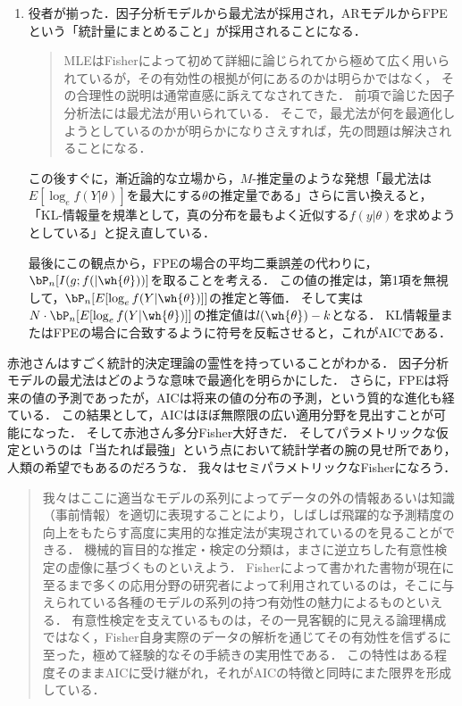 \documentclass[uplatex,dvipdfmx]{jsreport}
\begin{document}
\begin{history}
\begin{enumerate}
        \item 役者が揃った．因子分析モデルから最尤法が採用され，ARモデルからFPEという「統計量にまとめること」が採用されることになる．
        \begin{quote}
            MLEはFisherによって初めて詳細に論じられてから極めて広く用いられているが，その有効性の根拠が何にあるのかは明らかではなく，
            その合理性の説明は通常直感に訴えてなされてきた．
            前項で論じた因子分析法には最尤法が用いられている．
            そこで，最尤法が何を最適化しようとしているのかが明らかになりさえすれば，先の問題は解決されることになる．
        \end{quote}
        この後すぐに，漸近論的な立場から，$M$-推定量のような発想「最尤法は$E[\log_ef(Y|\theta)]$を最大にする$\theta$の推定量である」さらに言い換えると，
        「KL-情報量を規準として，真の分布を最もよく近似する$f(y|\theta)$を求めようとしている」と捉え直している．

        最後にこの観点から，FPEの場合の平均二乗誤差の代わりに，
        $\bP_n[I(g;f(|\wh{\theta}))]$を取ることを考える．
        この値の推定は，第1項を無視して，$\bP_n[E[\log_ef(Y|\wh{\theta})]]$の推定と等価．
        そして実は$N\cdot\bP_n[E[\log_ef(Y|\wh{\theta})]]$の推定値は$l(\wh{\theta})-k$となる．
        KL情報量またはFPEの場合に合致するように符号を反転させると，これがAICである．
    \end{enumerate}
\end{history}
\begin{remarks}
    赤池さんはすごく統計的決定理論の霊性を持っていることがわかる．
    因子分析モデルの最尤法はどのような意味で最適化を明らかにした．
    さらに，FPEは将来の値の予測であったが，AICは将来の値の分布の予測，という質的な進化も経ている．
    この結果として，AICはほぼ無際限の広い適用分野を見出すことが可能になった．
    そして赤池さん多分Fisher大好きだ．
    そしてパラメトリックな仮定というのは「当たれば最強」という点において統計学者の腕の見せ所であり，人類の希望でもあるのだろうな．
    我々はセミパラメトリックなFisherになろう．
    \begin{quote}
        我々はここに適当なモデルの系列によってデータの外の情報あるいは知識（事前情報）を適切に表現することにより，しばしば飛躍的な予測精度の向上をもたらす高度に実用的な推定法が実現されているのを見ることができる．
        機械的盲目的な推定・検定の分類は，まさに逆立ちした有意性検定の虚像に基づくものといえよう．
        Fisherによって書かれた書物が現在に至るまで多くの応用分野の研究者によって利用されているのは，そこに与えられている各種のモデルの系列の持つ有効性の魅力によるものといえる．
        有意性検定を支えているものは，その一見客観的に見える論理構成ではなく，Fisher自身実際のデータの解析を通じてその有効性を信ずるに至った，極めて経験的なその手続きの実用性である．
        この特性はある程度そのままAICに受け継がれ，それがAICの特徴と同時にまた限界を形成している．
    \end{quote}
\end{remarks}
\end{document}
